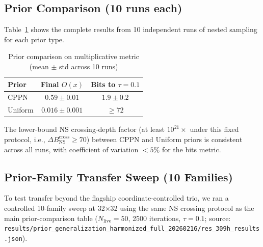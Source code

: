 \subsection{Prior Comparison (10 runs each)}

Table~\ref{tab:prior_comparison_full} shows the complete results from 10 independent runs of nested sampling for each prior type.

\begin{table}[H]
\centering
\caption{Prior comparison on multiplicative metric (mean $\pm$ std across 10 runs)}
\label{tab:prior_comparison_full}
\begin{tabular}{lcc}
\toprule
Prior & Final $O(x)$ & Bits to $\tau=0.1$ \\
\midrule
CPPN & $0.59 \pm 0.01$ & $1.9 \pm 0.2$ \\
Uniform & $0.016 \pm 0.001$ & $\geq 72$ \\
\bottomrule
\end{tabular}
\end{table}

The lower-bound NS crossing-depth factor (at least $10^{21}\times$ under this fixed protocol, i.e., $\Delta B_{\text{NS}}^{\text{cross}} \ge 70$) between CPPN and Uniform priors is consistent across all runs, with coefficient of variation $<5\%$ for the bits metric.

\subsection{Prior-Family Transfer Sweep (10 Families)}
\label{app:prior_family_sweep}

To test transfer beyond the flagship coordinate-controlled trio, we ran a controlled 10-family sweep at 32$\times$32 using the same NS crossing protocol as the main prior-comparison table ($N_{\text{live}}=50$, 2500 iterations, $\tau=0.1$; source: \texttt{results/prior\_generalization\_harmonized\_full\_20260216/res\_309h\_results.json}).

